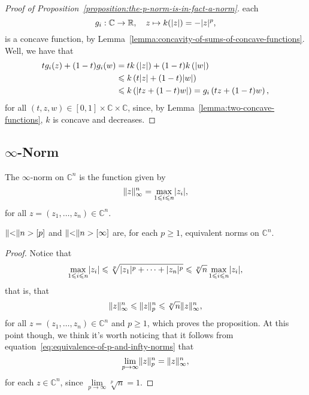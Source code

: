 \begin{proof}[Proof of Proposition~\ref{proposition:the-p-norm-is-in-fact-a-norm}]
  each
  \[
    g_{i}:\mathbb{C}\to\mathbb{R},\quad{z\mapsto{k(\lvert z\rvert)=-\lvert z\rvert^{p}}},
  \]
  is a concave function, by
  Lemma~\ref{lemma:concavity-of-sums-of-concave-functions}. Well, we have that
  \begin{align*}
    tg_{i}(z)+(1-t)g_{i}(w)
    &=
    tk\left(\lvert z\rvert\right)+(1-t)k\left(\lvert w\rvert\right)
    \\
    &\leqslant
    k\left(t\lvert z\rvert+(1-t)\lvert w\rvert\right)
    \\
    &\leqslant
    k\left(\lvert tz+(1-t)w\rvert\right)
    =
    g_{i}\left(tz+(1-t)w\right),
  \end{align*}
  for all \((t,z,w)\in{[0,1]\times\mathbb{C}\times\mathbb{C}}\), since,
  by Lemma~\ref{lemma:two-concave-functions}, \(k\) is concave and decreases.
\end{proof}

\subsection{\(\infty\)-Norm}\label{subsec:infty-norm}

\begin{definition}
  The \(\infty\)-norm on \(\mathbb{C}^{n}\) is the function given by
  \[
    \lVert z\rVert^{n}_{\infty}
    =
    \max\limits_{1\leqslant{i}\leqslant{n}}\lvert z_{i}\rvert,
  \]
  for all \(z=(z_{1},\ldots,z_{n})\in\mathbb{C}^{n}\).
\end{definition}

\begin{proposition}
  \(\lVert<\rVert n>[p]\) and \(\lVert<\rVert n>[\infty]\) are, for each \(p\geqslant{1}\),
  equivalent norms on \(\mathbb{C}^{n}\).
\end{proposition}

\begin{proof}
  Notice that
  \[
    \max\limits_{1\leqslant{i}\leqslant{n}}\lvert z_{i}\rvert
    \leqslant\sqrt[p]{\lvert z_{1}\rvert^{p}+\cdots+\lvert z_{n}\rvert^{p}}
    \leqslant\sqrt[p]{n}\max\limits_{1\leqslant{i}\leqslant{n}}\lvert z_{i}\rvert,
  \]
  that is, that
  \begin{equation}\label{eq:equivalence-of-p-and-infty-norms}
    \lVert z\rVert^{n}_{\infty}
    \leqslant
    \lVert z\rVert^{n}_{p}
    \leqslant
    \sqrt[p]{n}\lVert z\rVert^{n}_{\infty},
  \end{equation}
  for all \(z=(z_{1},\ldots,z_{n})\in\mathbb{C}^{n}\) and \(p\geqslant{1}\),
  which proves the proposition. At this point though, we think it's worth
  noticing that it follows from
  equation~\eqref{eq:equivalence-of-p-and-infty-norms} that
  \[
    \lim\limits_{p\to\infty}\lVert z\rVert^{n}_{p}=\lVert z\rVert^{n}_{\infty},
  \]
  for each \(z\in\mathbb{C}^{n}\), since
  \(\lim\limits_{p\to\infty}\sqrt[p]{n}=1\).
\end{proof}
